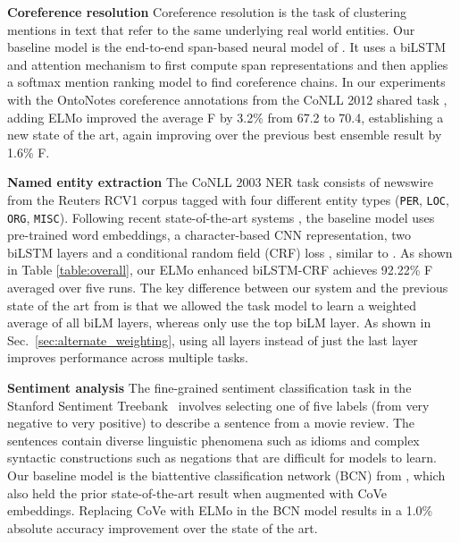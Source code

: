 \documentclass[11pt,a4paper]{article}
\newcommand{\ELMO}{ELMo}
\newcommand{\tinysection}[1]{\textbf{#1}}
\begin{document}
\tinysection{Coreference resolution} Coreference resolution is the task of clustering mentions in text that refer to the same underlying real world entities.
Our baseline model is the end-to-end span-based neural model of \citet{Lee2017EndtoendNC}.
It uses a biLSTM and attention mechanism to first compute span representations and then applies a softmax mention ranking model to find coreference chains.
In our experiments with the OntoNotes coreference annotations from the CoNLL 2012 shared task \citep{Pradhan2012CoNLL2012ST}, adding \ELMO{} improved the average F by 3.2\% from 67.2 to 70.4, establishing a new state of the art, again improving over the previous best ensemble result by 1.6\% F.

\tinysection{Named entity extraction}
The CoNLL 2003 NER task \citep{CoNLL2003NER} consists of newswire from the Reuters RCV1 corpus tagged with four different entity types (\texttt{PER}, \texttt{LOC}, \texttt{ORG}, \texttt{MISC}).
Following recent state-of-the-art systems \citep{lample-EtAl:2016:N16-1,Peters2017SemisupervisedST}, the baseline model uses pre-trained word embeddings, a character-based CNN representation, two biLSTM layers and a conditional random field (CRF) loss \citep{CRF:Lafferty2001}, similar to \citet{NLPfromScratch:Collobert2011}.
As shown in Table \ref{table:overall}, our \ELMO{} enhanced biLSTM-CRF achieves 92.22\% F averaged over five runs.
The key difference between our system and the previous state of the art from \citet{Peters2017SemisupervisedST} is that we allowed the task model to learn a weighted average of all biLM layers, whereas \citet{Peters2017SemisupervisedST} only use the top biLM layer.
As shown in Sec.~\ref{sec:alternate_weighting}, using all layers instead of just the last layer improves performance across multiple tasks.

\tinysection{Sentiment analysis}
The fine-grained sentiment classification task in the Stanford Sentiment Treebank~\citep[SST-5;][]{socher2013recursive} involves selecting one of five labels (from very negative to very positive) to describe a sentence from a movie review.
The sentences contain diverse linguistic phenomena such as idioms and complex syntactic constructions such as negations that are difficult for models to learn.
Our baseline model is the biattentive classification network (BCN) from \citet{McCann2017LearnedIT}, which also held the prior state-of-the-art result when augmented with CoVe embeddings. Replacing CoVe with \ELMO{} in the BCN model results in a 1.0\% absolute accuracy improvement over the state of the art.
\end{document}
